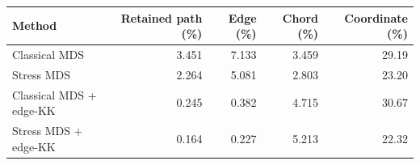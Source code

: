 \begin{tabular}{lrrrr}
\toprule
Method & Retained path (\%) & Edge (\%) & Chord (\%) & Coordinate (\%)\\
\midrule
Classical MDS & 3.451 & 7.133 & 3.459 & 29.19\\
Stress MDS & 2.264 & 5.081 & 2.803 & 23.20\\
Classical MDS + edge-KK & 0.245 & 0.382 & 4.715 & 30.67\\
Stress MDS + edge-KK & 0.164 & 0.227 & 5.213 & 22.32\\
\bottomrule
\end{tabular}
